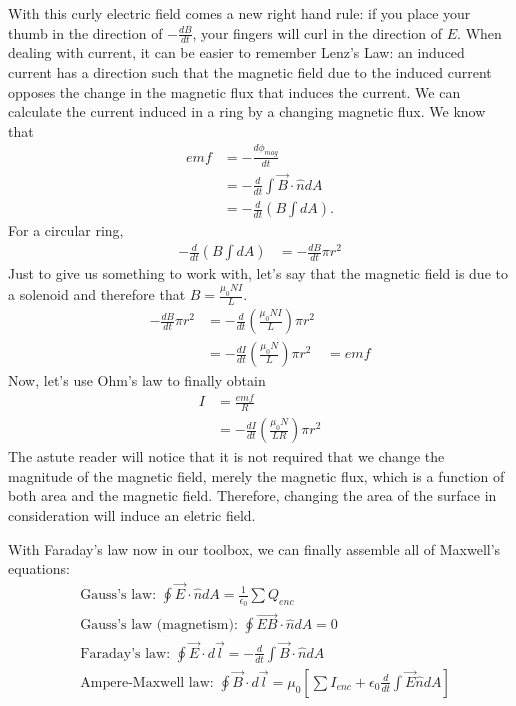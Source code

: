 \documentclass[nobib]{tufte-handout}
\begin{document}
With this curly electric field comes a new right hand rule: 
if you place your thumb in the direction of $-\frac{dB}{dt}$, your fingers 
will curl in the direction of $E$. When dealing with current, it can be easier 
to remember Lenz's Law: an induced current has a direction such that the
magnetic field due to the induced current opposes the
change in the magnetic flux that induces the current.
We can calculate the current induced in a ring by a changing magnetic flux. 
We know that 
\begin{align*}
    emf &= -\frac{d\phi_{mag}}{dt} \\
    &= -\frac{d}{dt} \int \vec{B} \cdot \hat{n}dA \\
    &= -\frac{d}{dt} (B\int dA).
\end{align*}
For a circular ring, 
\begin{align*}
    -\frac{d}{dt} (B\int dA) &= -\frac{dB}{dt} \pi r^2
\end{align*}
Just to give us something to work with, let's say that 
the magnetic field is due to a solenoid and therefore that 
$B = \frac{\mu_0 N I}{L}$. 
\begin{align*}
    -\frac{dB}{dt} \pi r^2 &= -\frac{d}{dt}\left(\frac{\mu_0 N I}{L}\right) \pi r^2\\
    &= -\frac{dI}{dt}\left(\frac{\mu_0 N}{L}\right) \pi r^2
    &= emf
\end{align*}
Now, let's use Ohm's law to finally obtain 
\begin{align*}
    I &= \frac{emf}{R} \\
    &= -\frac{dI}{dt}\left(\frac{\mu_0 N}{LR}\right) \pi r^2
\end{align*}
The astute reader will notice that it is not required that we change the magnitude of the 
magnetic field, merely the magnetic flux, which is a function of both area and the 
magnetic field. Therefore, changing the area of the surface in consideration will 
induce an eletric field. 

With Faraday's law now in our toolbox, we can finally assemble all of 
Maxwell's equations: 
\begin{align*}
    &\text{Gauss's law: } \oint \vec{E} \cdot \hat{n} dA = \frac{1}{\epsilon_0} \sum Q_{enc} \\
    &\text{Gauss's law (magnetism): } \oint \vec{EB} \cdot \hat{n} dA = 0 \\
    &\text{Faraday's law: } \oint \vec{E} \cdot d\vec{l} = -\frac{d}{dt} \int \vec{B} \cdot \hat{n} dA \\
    &\text{Ampere-Maxwell law: } \oint \vec{B} \cdot d\vec{l} = \mu_0 \left[\sum I_{enc} + \epsilon_0 \frac{d}{dt} \int \vec{E} \hat{n}dA\right]
\end{align*}
\end{document}
